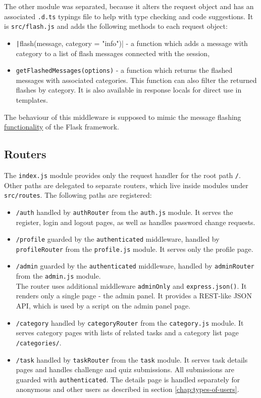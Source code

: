 The other module was separated, because it alters the request object and has an associated \texttt{.d.ts} typings file to help with type checking and code suggestions. It is \texttt{src/flash.js} and adds the following methods to each request object:
\begin{itemize}
    \item \texttt|flash(message, category = "info")| - a function which adds a message with category to a list of flash messages connected with the session,
    \item \texttt{getFlashedMessages(options)} - a function which returns the flashed messages with associated categories. This function can also filter the returned flashes by category. It is also available in response locals for direct use in templates.
\end{itemize}

The behaviour of this middleware is supposed to mimic the message flashing \href{https://flask.palletsprojects.com/en/2.2.x/quickstart/#message-flashing}{functionality} of the Flask framework.

\subsection{Routers}

The \texttt{index.js} module provides only the request handler for the root path \texttt{/}. Other paths are delegated to separate routers, which live inside modules under \texttt{src/routes}. The following paths are registered:
\begin{itemize}
    \item \texttt{/auth} handled by \texttt{authRouter} from the \texttt{auth.js} module. It serves the register, login and logout pages, as well as handles password change requests.
    \item \texttt{/profile} guarded by the \texttt{authenticated} middleware, handled by \texttt{profileRouter} from the \texttt{profile.js} module. It serves only the profile page.
    \item \texttt{/admin} guarded by the \texttt{authenticated} middleware, handled by \texttt{adminRouter} from the \texttt{admin.js} module.\\
    The router uses additional middleware \texttt{adminOnly} and \texttt{express.json()}. It renders only a single page - the admin panel. It provides a REST-like JSON API, which is used by a script on the admin panel page.
    \item \texttt{/category} handled by \texttt{categoryRouter} from the \texttt{category.js} module. It serves category pages with lists of related tasks and a category list page \texttt{/categories/}.
    \item \texttt{/task} handled by \texttt{taskRouter} from the \texttt{task} module. It serves task details pages and handles challenge and quiz submissions. All submissions are guarded with \texttt{authenticated}. The details page is handled separately for anonymous and other users as described in section \ref{chap:types-of-users}.
\end{itemize}

